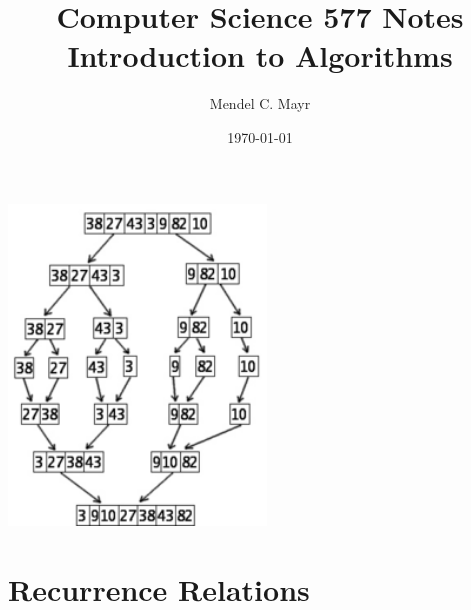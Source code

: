 \documentclass{article}
\title{Computer Science 577 Notes \\ Introduction to Algorithms}
\author{Mendel C. Mayr}
\date{\today}
\begin{document}
	\maketitle
	\vspace{10pt}
	\begin{center}
		\includegraphics[width = 2.7in]{mergesort.png}
		\end{center}
	\vspace{12pt}
	\tableofcontents
	\clearpage

	\section{Recurrence Relations}
\end{document}
